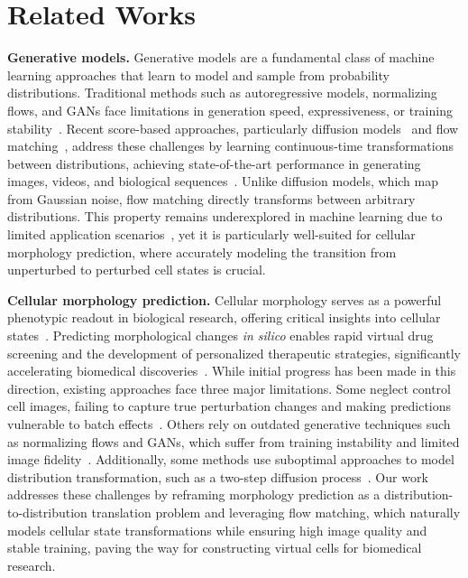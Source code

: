 \section{Related Works}
\label{sec:related}

\textbf{Generative models.}
Generative models are a fundamental class of machine learning approaches that learn to model and sample from probability distributions. Traditional methods such as autoregressive models, normalizing flows, and GANs face limitations in generation speed, expressiveness, or training stability~\cite{van2016pixel,papamakarios2021normalizing,goodfellow2014generative}. Recent score-based approaches, particularly diffusion models~\cite{sohl2015deep,song2019generative,ho2020denoising} and flow matching~\cite{lipman2022flow,lipman2024flow,liu2022flow,liu2024flowing}, address these challenges by learning continuous-time transformations between distributions, achieving state-of-the-art performance in generating images, videos, and biological sequences~\cite{openai2024gpt4technicalreport,esser2024scaling,pmlr-v235-kondratyuk24a,hayes2025simulating}. Unlike diffusion models, which map from Gaussian noise, flow matching directly transforms between arbitrary distributions. This property remains underexplored in machine learning due to limited application scenarios~\cite{liu2024flowing}, yet it is particularly well-suited for cellular morphology prediction, where accurately modeling the transition from unperturbed to perturbed cell states is crucial.

\textbf{Cellular morphology prediction.} Cellular morphology serves as a powerful phenotypic readout in biological research, offering critical insights into cellular states~\cite{perlman2004multidimensional,loo2007image}. Predicting morphological changes \textit{in silico} enables rapid virtual drug screening and the development of personalized therapeutic strategies, significantly accelerating biomedical discoveries~\cite{carpenter2007image,bunne2024build}. While initial progress has been made in this direction, existing approaches face three major limitations. Some neglect control cell images, failing to capture true perturbation changes and making predictions vulnerable to batch effects~\cite{yang2021mol2image,navidi2024morphodiff,cook2024diffusion}. Others rely on outdated generative techniques such as normalizing flows and GANs, which suffer from training instability and limited image fidelity~\cite{lamiable2023revealing,palma2023predicting}. Additionally, some methods use suboptimal approaches to model distribution transformation, such as a two-step diffusion process~\cite{bourou2024phendiff,hung2024lumic}. Our work addresses these challenges by reframing morphology prediction as a distribution-to-distribution translation problem and leveraging flow matching, which naturally models cellular state transformations while ensuring high image quality and stable training, paving the way for constructing virtual cells for biomedical research.  

